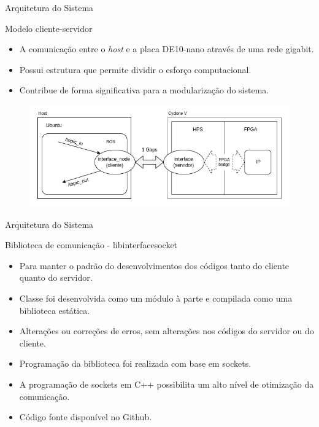 \documentclass[10pt]{beamer}
\begin{document}
\begin{frame}{Arquitetura do Sistema}
    \begin{alertblock}{Modelo cliente-servidor}
		\vspace{0.2cm}
		\begin{itemize}
			\item A comunicação entre o \textit{host} e a placa DE10-nano através de uma rede gigabit.
			\item Possui estrutura que permite dividir o esforço computacional.
			\item Contribue de forma significativa para a modularização do sistema.
		\end{itemize}
		\begin{figure}[h]
			\begin{center}
				\includegraphics[scale=0.42]{imagens/arquitetura_geral.png}\\
			\end{center}
			\label{fig:arquitetura}
		\end{figure}
	\end{alertblock}
\end{frame}


\begin{frame}{Arquitetura do Sistema}
	\begin{alertblock}{Biblioteca de comunicação - libinterfacesocket}
		\vspace{0.2cm}
	    \begin{itemize}
			\setlength\itemsep{0.7em}
	        \item Para manter o padrão do desenvolvimentos dos códigos tanto do cliente quanto do servidor.
	        \item Classe foi desenvolvida como um módulo à parte e compilada como uma biblioteca estática.
	        \item Alterações ou correções de erros, sem alterações nos códigos do servidor ou do cliente.
	        \item Programação da biblioteca foi realizada com base em sockets.
	        \item A programação de sockets em C++ possibilita um alto nível de otimização da comunicação.
	        \item Código fonte disponível no Github.
	    \end{itemize}
	\end{alertblock}
\end{frame}
\end{document}
